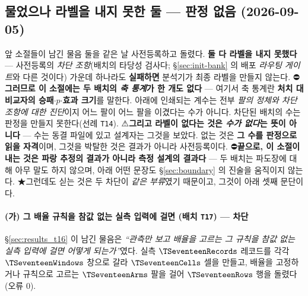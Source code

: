 \documentclass[11pt]{report}
\numberwithin{equation}{chapter}
\numberwithin{figure}{chapter}
\numberwithin{table}{chapter}
\begin{document}
\subsection{물었으나 라벨을 내지 못한 둘 --- 판정 없음 (2026-09-05)}
\label{sec:results_blocked}

앞 소절들이 남긴 물음 둘을 같은 날 사전등록하고 돌렸다. \textbf{둘 다 라벨을 내지 못했다}
--- 사전등록의 \emph{차단 조항}(배치의 타당성 검사다; \S\ref{sec:init-bank} 의 배포
\emph{라우팅 게이트}와 다른 것이다) 가운데 하나라도 \textbf{실패하면} 분석기가 최종 라벨을
만들지 않는다.
⛔\textbf{그러므로 이 소절에는 두 배치의 \emph{축 통계}가 한 개도 없다} --- 여기서 축
통계란 \textbf{처치 대 비교자의 승패$\cdot$$p$$\cdot$효과 크기}를 말한다. 아래에 인쇄되는
계수는 전부 \emph{팔의 정체와 차단 조항에 대한 진단}이지 어느 팔이 어느 팔을 이겼다는 수가
아니다. 차단된 배치의 수는 판정을 만들지 못한다(선례 \texttt{T14}).
⚠\textbf{그리고 라벨이 없다는 것은 \emph{수가 없다}는 뜻이 아니다} --- 수는 동결 파일에
있고 설계자는 그것을 보았다. 없는 것은 \textbf{그 수를 판정으로 읽을 자격}이며, 그것을
박탈한 것은 결과가 아니라 사전등록이다.
⛔\textbf{끝으로, 이 소절이 내는 것은 파랑 추정의 결과가 아니라 측정 설계의 결과다} ---
두 배치는 파도장에 대해 아무 말도 하지 않으며, 아래 어떤 문장도 \S\ref{sec:boundary} 의
진술을 움직이지 않는다. ★그런데도 싣는 것은 두 차단이 \emph{같은 부류}였기 때문이고,
그것이 아래 셋째 문단이다.

\paragraph{(가) 그 배율 규칙을 참값 없는 실측 입력에 걸면 (배치 \texttt{T17}) --- 차단}
\S\ref{sec:results_t16} 이 남긴 물음은 \emph{``관측만 보고 배율을 고르는 그 규칙을 참값 없는
실측 입력에 걸면 어떻게 되는가''}였다. 실측 $\TSeventeenRecords$ 레코드를 각각
$\TSeventeenWindows$ 창으로 갈라 $\TSeventeenCells$ 셀을 만들고, 배율을 고정하거나 규칙으로
고르는 $\TSeventeenArms$ 팔을 걸어 $\TSeventeenRows$ 행을 돌렸다(오류 $0$).
\end{document}
